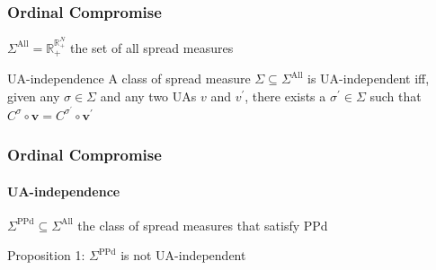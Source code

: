 \documentclass{beamer}
\newcommand{\R}{\mathbb{R}}
\newcommand{\SPPd}{\Sigma^\text{PPd}}
\newcommand{\SAll}{\Sigma^\text{All}}
\newcommand{\vpr}{\mathbf{v}}
\begin{document}
\begin{frame}
	\frametitle{Ordinal Compromise}
	$\SAll = \R_+^{\R_+^N}$ the set of all spread measures
	\vspace{5mm}
	\begin{block}{UA-independence}
		A class of spread measure $\Sigma \subseteq \SAll$ is UA-independent iff, given any $\sigma \in \Sigma $ and any two UAs $v$ and $v^{\prime }$, there exists a $\sigma^\prime\in \Sigma $ such that $C^{\sigma}\circ \vpr = C^{\sigma ^{\prime}} \circ \vpr^\prime$
	\end{block}
\end{frame}

\begin{frame}
	\frametitle{Ordinal Compromise}
	\framesubtitle{UA-independence}
	$\SPPd \subseteq \SAll$ the class of spread measures that satisfy PPd
	\begin{block}{Proposition 1:}
		$\SPPd$ is not UA-independent
	\end{block}
\end{frame}
\end{document}
